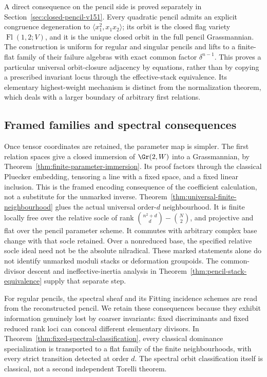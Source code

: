 \documentclass[11pt,reqno]{amsart}
\numberwithin{equation}{section}
\theoremstyle{definition}\newtheorem{definition}[theorem]{Definition}
\theoremstyle{remark}\newtheorem{remark}[theorem]{Remark}
\begin{document}
A direct consequence on the pencil side is proved separately in
Section~\ref{sec:closed-pencil-v151}.  Every quadratic pencil admits
an explicit congruence degeneration to
\(\langle x_1^2,x_1x_2\rangle\); its orbit is the closed flag
variety \(\operatorname{Fl}(1,2;V)\), and it is the unique closed
orbit in the full pencil Grassmannian.  The construction is uniform
for regular and singular pencils and lifts to a finite-flat family
of their failure algebras with exact common factor
\(\delta^{n-1}\).  This proves a particular universal orbit-closure
adjacency by equations, rather than by copying a prescribed invariant
locus through the effective-stack equivalence.  Its elementary
highest-weight mechanism is distinct from the normalization theorem,
which deals with a larger boundary of arbitrary first relations.

\subsection{Framed families and spectral consequences}
Once tensor coordinates are retained, the parameter map is simpler.
The first relation spaces give a closed immersion of
\(\Gr(2,W)\) into a Grassmannian, by
Theorem~\ref{thm:finite-parameter-immersion}.  Its proof factors through
the classical Pluecker embedding, tensoring a line with a fixed space,
and a fixed linear inclusion.  This is the framed encoding consequence
of the coefficient calculation, not a substitute for the unmarked
inverse.  Theorem~\ref{thm:universal-finite-neighbourhood} glues the
actual universal order-\(d\) neighbourhood.  It is finite locally
free over the relative socle of rank
\(\binom{n^2+d}{d}-\binom N2\), and projective and flat over the
pencil parameter scheme.  It commutes with arbitrary complex base
change with that socle retained.  Over a nonreduced base, the specified
relative socle ideal need not be the absolute nilradical.  These marked statements alone do not identify unmarked moduli
stacks or deformation groupoids.  The common-divisor descent and
ineffective-inertia analysis in
Theorem~\ref{thm:pencil-stack-equivalence} supply that separate step.

For regular pencils, the spectral sheaf and its Fitting incidence
schemes are read from the reconstructed pencil.  We retain these
consequences because they exhibit information genuinely lost by
coarser invariants: fixed discriminants and fixed reduced rank loci
can conceal different elementary divisors.  In
Theorem~\ref{thm:fixed-spectral-classification}, every classical
dominance specialization is transported to a flat family of the
finite neighbourhoods, with every strict transition detected at
order \(d\).  The spectral orbit classification itself is classical,
not a second independent Torelli theorem.
\end{document}
